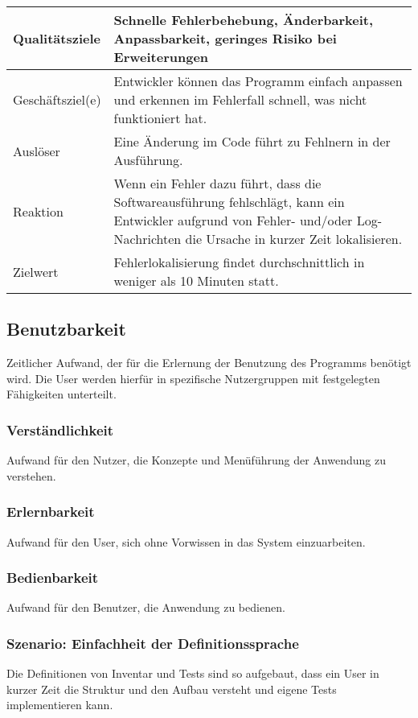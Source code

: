 \documentclass[
	ngerman,
	toc=listof, %
	toc=bibliography, %
	footnotes=multiple, %
	parskip=half, %
	numbers=noendperiod %
]{scrartcl}
\begin{document}
			\begin{tabularx}{\textwidth}{lX}
				\toprule
				Qualitätsziele & Schnelle Fehlerbehebung, Änderbarkeit, Anpassbarkeit, geringes Risiko bei Erweiterungen  \\
				\midrule
				Geschäftsziel(e) & Entwickler können das Programm einfach anpassen und erkennen im Fehlerfall schnell, was nicht funktioniert hat.  \\
				\midrule
				Auslöser & Eine Änderung im Code führt zu Fehlnern in der Ausführung.  \\
				\midrule
				Reaktion & Wenn ein Fehler dazu führt, dass die Softwareausführung fehlschlägt, kann ein Entwickler aufgrund von Fehler- und/oder Log-Nachrichten die Ursache in kurzer Zeit lokalisieren.  \\
				\midrule
				Zielwert & Fehlerlokalisierung findet durchschnittlich in weniger als 10 Minuten statt.  \\
				\bottomrule
			\end{tabularx}
			\newpage

	\subsection{Benutzbarkeit}
		Zeitlicher Aufwand, der für die Erlernung der Benutzung des Programms benötigt wird. 
		Die User werden hierfür in spezifische Nutzergruppen mit festgelegten Fähigkeiten unterteilt.
		
		\subsubsection{Verständlichkeit}
			Aufwand für den Nutzer, die Konzepte und Menüführung der Anwendung zu verstehen.

		\subsubsection{Erlernbarkeit}
			Aufwand für den User, sich ohne Vorwissen in das System einzuarbeiten.

		\subsubsection{Bedienbarkeit}
			Aufwand für den Benutzer, die Anwendung zu bedienen.

		\subsubsection{Szenario: Einfachheit der Definitionssprache}
			Die Definitionen von Inventar und Tests sind so aufgebaut, dass ein User in kurzer Zeit die Struktur und den Aufbau versteht und eigene Tests implementieren kann.
			
\end{document}
